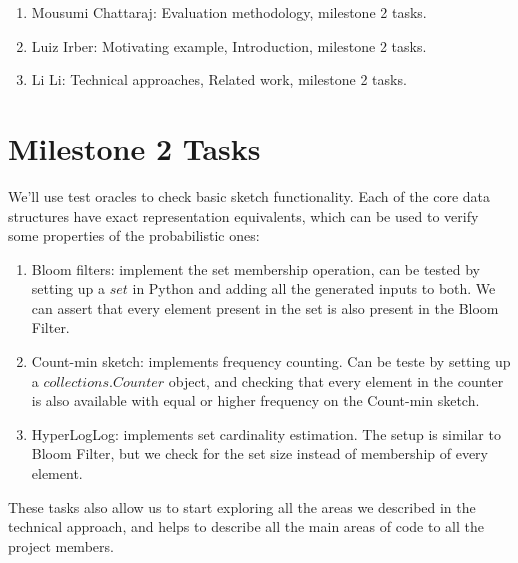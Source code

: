\documentclass[preprint,nocopyrightspace]{sig-alternate}
\begin{document}
\begin{enumerate}
\item[] Mousumi Chattaraj: Evaluation methodology, milestone 2 tasks.
\item[] Luiz Irber: Motivating example, Introduction, milestone 2 tasks.
\item[] Li Li: Technical approaches, Related work, milestone 2 tasks.
\end{enumerate}

\section{Milestone 2 Tasks}

We'll use test oracles to check basic sketch functionality.
Each of the core data structures have exact representation equivalents,
which can be used to verify some properties of the probabilistic ones:
\begin{enumerate}
\item Bloom filters: implement the set membership operation,
can be tested by setting up a $set$ in Python and adding all the generated inputs to both.
We can assert that every element present in the set is also present in the Bloom Filter.
\item Count-min sketch: implements frequency counting.
Can be teste by setting up a $collections.Counter$ object,
and checking that every element in the counter is also available with equal or higher frequency on the Count-min sketch.
\item HyperLogLog: implements set cardinality estimation.
The setup is similar to Bloom Filter,
but we check for the set size instead of membership of every element.
\end{enumerate}

These tasks also allow us to start exploring all the areas we described in the technical approach,
and helps to describe all the main areas of code to all the project members.


\end{document}
